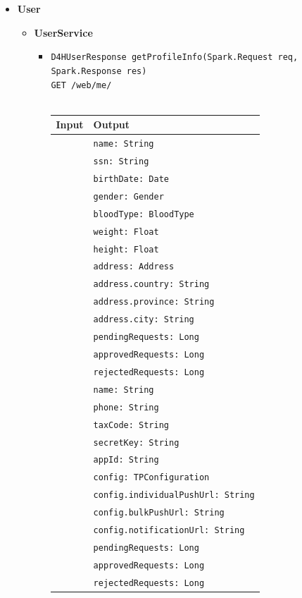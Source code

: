 \documentclass[a4paper, hidelinks, 12pt]{report}
\begin{document}
\begin{itemize}
			\item{\textbf{User}}
			\begin{itemize}
				\item{\textbf{UserService}}
					\begin{itemize}
			\item{\verb|D4HUserResponse getProfileInfo(Spark.Request req,|\\ \verb|Spark.Response res)|\\ \verb|GET /web/me/|}\\\\
			\begin{tabular}{l | l}
			\textbf{Input} & \textbf{Output} \\
			\hline
				& \verb|name: String| \\
				& \verb|ssn: String| \\
				& \verb|birthDate: Date| \\
				& \verb|gender: Gender| \\
				& \verb|bloodType: BloodType| \\
				& \verb|weight: Float| \\
				& \verb|height: Float| \\
				& \verb|address: Address| \\
				& \verb|address.country: String| \\
				& \verb|address.province: String| \\
				& \verb|address.city: String| \\
				& \verb|pendingRequests: Long| \\
				& \verb|approvedRequests: Long| \\
				& \verb|rejectedRequests: Long| \\
				\hline
				& \verb|name: String| \\
				& \verb|phone: String| \\
				& \verb|taxCode: String| \\
				& \verb|secretKey: String| \\
				& \verb|appId: String| \\
				& \verb|config: TPConfiguration| \\
				& \verb|config.individualPushUrl: String| \\
				& \verb|config.bulkPushUrl: String| \\
				& \verb|config.notificationUrl: String| \\
				& \verb|pendingRequests: Long| \\
				& \verb|approvedRequests: Long| \\
				& \verb|rejectedRequests: Long| \\
				

\end{tabular}
\end{itemize}
\end{itemize}
\end{itemize}
\end{document}
